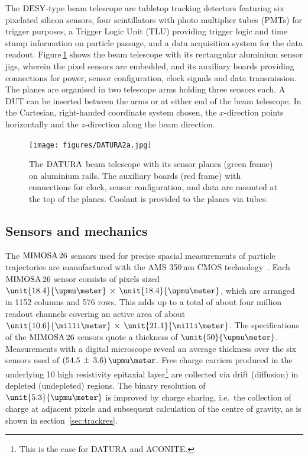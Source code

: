 
The $\textrm{DESY}$-type beam telescope are tabletop tracking detectors featuring six pixelated silicon sensors, four scintillators with photo multiplier tubes (PMTs) for trigger purposes,
 a Trigger Logic Unit (TLU) providing trigger logic and time stamp information on particle passage, and a data acquisition system for the data readout. 
Figure\,\ref{fig:datura-tscope} shows the beam telescope with its rectangular aluminium sensor jigs, wherein the pixel sensors are embedded,
 and its auxiliary boards providing connections for power, sensor configuration, clock signals and data transmission. 
The planes are organised in two telescope arms holding three sensors each. 
A DUT can be inserted between the arms or at either end of the beam telescope. 
In the Cartesian, right-handed coordinate system chosen, the $x$-direction points horizontally and the $z$-direction along the beam direction.

\begin{figure}[tb]
	\center
	\texttt{[image: figures/DATURA2a.jpg]}
	\caption[The $\Datura$ telescope]{The $\Datura$ beam telescope with its sensor planes (green frame) on aluminium rails.
	The auxiliary boards (red frame) with connections for clock, sensor configuration, and data are mounted at the top of the planes.
	Coolant is provided to the planes via tubes.}
	\label{fig:datura-tscope}
\end{figure}
 
\subsection{Sensors and mechanics}
\label{sec:sensors}

The $\textrm{MIMOSA\,26}$ sensors used for precise spacial measurements of particle trajectories are manufactured with the AMS 350\,nm CMOS technology~\cite{HuGuo2010480}. 
Each $\textrm{MIMOSA\,26}$ sensor consists of pixels sized $\unit{18.4}{\upmu\meter}\,\times\,\unit{18.4}{\upmu\meter}$, which are arranged in 1152 columns and 576 rows.
This adds up to a total of about four million readout channels covering an active area of about $\unit{10.6}{\milli\meter}\,\times\,\unit{21.1}{\milli\meter}$. 
The specifications of the $\textrm{MIMOSA\,26}$ sensors quote a thickness of $\unit{50}{\upmu\meter}$. 
Measurements with a digital microscope reveal an average thickness over the six sensors used of $(54.5\,\pm\,3.6)\,\upmu\meter$. 
Free charge carriers produced in the underlying \unit{10}{\upmu\meter} high resistivity epitaxial layer\footnote{This is the case for DATURA and ACONITE.} %
 are collected via drift (diffusion) in depleted (undepleted) regions. 
The binary resolution of $\unit{5.3}{\upmu\meter}$ is improved by charge sharing, i.e.\ the collection of charge at adjacent pixels and subsequent calculation of the centre of gravity,
 as is shown in section~\ref{sec:trackres}.

